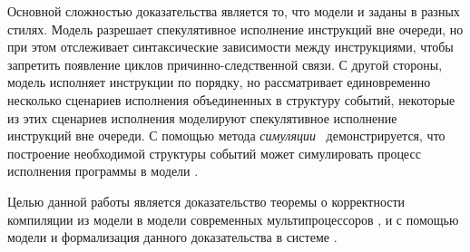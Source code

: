 Основной сложностью доказательства является то, что модели \Wkm и \IMM
заданы в разных стилях. Модель \IMM разрешает спекулятивное 
исполнение инструкций вне очереди, но при этом 
отслеживает синтаксические зависимости между инструкциями, 
чтобы запретить появление циклов причинно-следственной связи. 
С другой стороны, модель \Wkm исполняет инструкции по порядку, 
но рассматривает единовременно несколько сценариев исполнения
объединенных в структуру событий,
некоторые из этих сценариев исполнения моделируют 
спекулятивное исполнение инструкций вне очереди. 
С помощью метода \emph{симуляции}~\cite{Milner:1971} 
демонстрируется, что построение необходимой структуры событий может 
симулировать процесс исполнения программы в модели \IMM.

\pagebreak


Целью данной работы является доказательство 
теоремы о корректности компиляции из модели \Wkm 
в модели современных мультипроцессоров \Intel, \ARM и \POWER
с помощью модели \IMM и формализация данного доказательства в системе \coq. 

